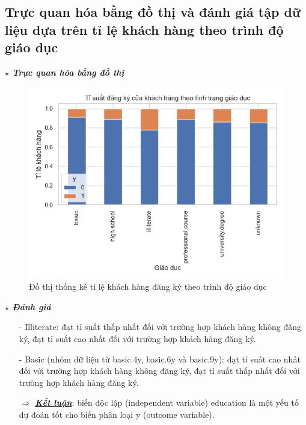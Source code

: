 \documentclass{report}
\begin{document}
        \pagebreak

        \subsection{Trực quan hóa bằng đồ thị và đánh giá tập dữ liệu dựa trên tỉ lệ khách hàng theo trình độ giáo dục}
            \fontsize{13}{10}\selectfont \textbf{$\star$\textit{ Trực quan hóa bằng đồ thị}}
                \begin{figure}[htp]
                    \centering
                    \includegraphics[scale = 0.8]{image/frequency_education.png}
                    \caption{Đồ thị thống kê tỉ lệ khách hàng đăng ký theo trình độ giáo dục}
                \end{figure}
            
            \fontsize{13}{10}\selectfont \textbf{$\star$\textit{ Đánh giá}}
                \begin{enumerate}
                    \item [- ] Illiterate: đạt tỉ suất thấp nhất đối với trường hợp khách hàng không đăng ký, đạt tỉ suất cao nhất đối với trường hợp khách hàng đăng ký.
                    \item [- ] Basic (nhóm dữ liệu từ basic.4y, basic.6y và basic.9y): đạt tỉ suất cao nhất đối với trường hợp khách hàng không đăng ký, đạt tỉ suất thấp nhất đối với trường hợp khách hàng đăng ký.
                    \item [$\Rightarrow$] \textbf{\underline{\textit{Kết luận}}}: biến độc lập (independent variable) education là một yếu tố dự đoán tốt cho biến phân loại y (outcome variable).
                \end{enumerate}
                 
\end{document}
